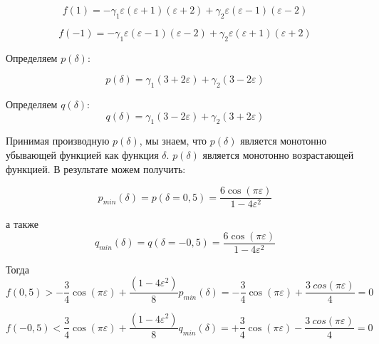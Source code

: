 \begin{equation}
\label{eq:equation40}
f(1) = -\gamma_1 \varepsilon(\varepsilon+1)(\varepsilon + 2) + \gamma_2 \varepsilon(\varepsilon-1)(\varepsilon - 2)
\end{equation}

\begin{equation}
\label{eq:equation41}
f(-1) = -\gamma_1 \varepsilon(\varepsilon-1)(\varepsilon - 2) + \gamma_2 \varepsilon(\varepsilon+1)(\varepsilon + 2)
\end{equation}

Определяем $p(\delta)$:

\begin{equation}
\label{eq:equation42}
p(\delta) = \gamma_1 (3+2\varepsilon) + \gamma_2 (3-2\varepsilon)
\end{equation}

Определяем $q(\delta)$:
\begin{equation}
\label{eq:equation43}
q(\delta) = \gamma_1 (3-2\varepsilon) + \gamma_2 (3+2\varepsilon)
\end{equation}

Принимая производную $p(\delta)$, мы знаем, что $p(\delta)$ является монотонно убывающей функцией как функция $\delta$. $p(\delta)$ является монотонно возрастающей функцией.
В результате можем получить:

\begin{equation}
\label{eq:equation44}
p_{min}(\delta) = p(\delta = 0,5) = \frac{6 \cos(\pi  \varepsilon)}{1-4\varepsilon ^2}
\end{equation}

а также
\begin{equation}
\label{eq:equation45}
q_{min}(\delta) = q(\delta = -0,5) = \frac{6 \cos(\pi  \varepsilon)}{1-4\varepsilon ^2}
\end{equation}

Тогда
\begin{equation}
\label{eq:equation46}
f(0,5) > -\frac{3}{4} \cos (\pi \varepsilon) + \frac{(1-4 \varepsilon ^2)}{8} p_{min} (\delta) = - \frac{3}{4} \cos(\pi \varepsilon) + \frac{3 \ cos(\pi \varepsilon)}{4} = 0 
\end{equation}

\begin{equation}
\label{eq:equation47}
f(-0,5) < \frac{3}{4} \cos (\pi \varepsilon) + \frac{(1-4 \varepsilon ^2)}{8} q_{min} (\delta) = + \frac{3}{4} \cos(\pi \varepsilon) - \frac{3 \ cos(\pi \varepsilon)}{4} = 0 
\end{equation}


